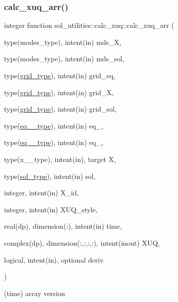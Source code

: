 \subsubsection{\texorpdfstring{calc\+\_\+xuq\+\_\+arr()}{calc\_xuq\_arr()}}
{\footnotesize\ttfamily integer function sol\+\_\+utilities\+::calc\+\_\+xuq\+::calc\+\_\+xuq\+\_\+arr (\begin{DoxyParamCaption}\item[{type(modes\+\_\+type), intent(in)}]{mds\+\_\+X,  }\item[{type(modes\+\_\+type), intent(in)}]{mds\+\_\+sol,  }\item[{type(\hyperlink{structgrid__vars_1_1grid__type}{grid\+\_\+type}), intent(in)}]{grid\+\_\+eq,  }\item[{type(\hyperlink{structgrid__vars_1_1grid__type}{grid\+\_\+type}), intent(in)}]{grid\+\_\+X,  }\item[{type(\hyperlink{structgrid__vars_1_1grid__type}{grid\+\_\+type}), intent(in)}]{grid\+\_\+sol,  }\item[{type(\hyperlink{structeq__vars_1_1eq__1__type}{eq\+\_\+1\+\_\+type}), intent(in)}]{eq\+\_,  }\item[{type(\hyperlink{structeq__vars_1_1eq__2__type}{eq\+\_\+2\+\_\+type}), intent(in)}]{eq\+\_,  }\item[{type(x\+\_\+1\+\_\+type), intent(in), target}]{X,  }\item[{type(\hyperlink{structsol__vars_1_1sol__type}{sol\+\_\+type}), intent(in)}]{sol,  }\item[{integer, intent(in)}]{X\+\_\+id,  }\item[{integer, intent(in)}]{X\+U\+Q\+\_\+style,  }\item[{real(dp), dimension(\+:), intent(in)}]{time,  }\item[{complex(dp), dimension(\+:,\+:,\+:,\+:), intent(inout)}]{X\+UQ,  }\item[{logical, intent(in), optional}]{deriv }\end{DoxyParamCaption})}



(time) array version 


